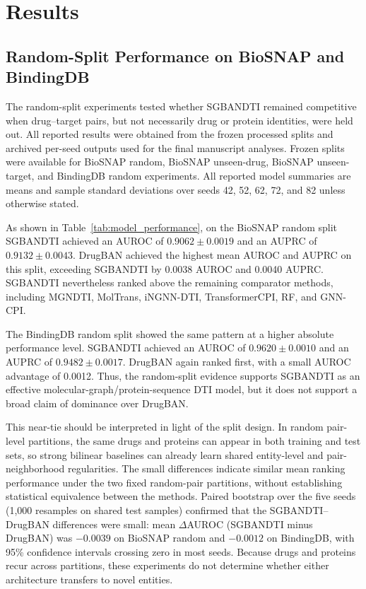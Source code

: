 \documentclass[computers,article,submit,moreauthors]{Definitions/mdpi}
\begin{document}
\section{Results}
\subsection{Random-Split Performance on BioSNAP and BindingDB}
The random-split experiments tested whether SGBANDTI remained competitive when drug--target pairs, but not necessarily drug or protein identities, were held out. All reported results were obtained from the frozen processed splits and archived per-seed outputs used for the final manuscript analyses. Frozen splits were available for BioSNAP random, BioSNAP unseen-drug, BioSNAP unseen-target, and BindingDB random experiments. All reported model summaries are means and sample standard deviations over seeds 42, 52, 62, 72, and 82 unless otherwise stated.

As shown in Table~\ref{tab:model_performance}, on the BioSNAP random split SGBANDTI achieved an AUROC of $0.9062 \pm 0.0019$ and an AUPRC of $0.9132 \pm 0.0043$. DrugBAN achieved the highest mean AUROC and AUPRC on this split, exceeding SGBANDTI by 0.0038 AUROC and 0.0040 AUPRC. SGBANDTI nevertheless ranked above the remaining comparator methods, including MGNDTI, MolTrans, iNGNN-DTI, TransformerCPI, RF, and GNN-CPI.

The BindingDB random split showed the same pattern at a higher absolute performance level. SGBANDTI achieved an AUROC of $0.9620 \pm 0.0010$ and an AUPRC of $0.9482 \pm 0.0017$. DrugBAN again ranked first, with a small AUROC advantage of 0.0012. Thus, the random-split evidence supports SGBANDTI as an effective molecular-graph/protein-sequence DTI model, but it does not support a broad claim of dominance over DrugBAN.

This near-tie should be interpreted in light of the split design. In random pair-level partitions, the same drugs and proteins can appear in both training and test sets, so strong bilinear baselines can already learn shared entity-level and pair-neighborhood regularities. The small differences indicate similar mean ranking performance under the two fixed random-pair partitions, without establishing statistical equivalence between the methods. Paired bootstrap over the five seeds (1,000 resamples on shared test samples) confirmed that the SGBANDTI--DrugBAN differences were small: mean $\Delta$AUROC (SGBANDTI minus DrugBAN) was $-0.0039$ on BioSNAP random and $-0.0012$ on BindingDB, with 95\% confidence intervals crossing zero in most seeds. Because drugs and proteins recur across partitions, these experiments do not determine whether either architecture transfers to novel entities.
\end{document}
